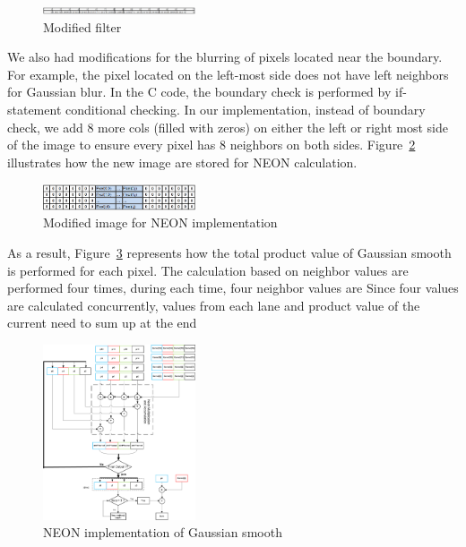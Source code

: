 \begin{figure}
\centering
\includegraphics[width=0.4\textwidth]{drawings/filter}
\caption{Modified filter}
\label{fig:newfilter}
\end{figure}

We also had modifications for the blurring of pixels located near the boundary. For example, the pixel located on the left-most side does not have left neighbors for Gaussian blur. In the C code, the boundary check is performed by if-statement conditional checking. In our implementation, instead of boundary check, we add 8 more cols (filled with zeros) on either the left or right most side of the image to ensure every pixel has 8 neighbors on both sides. Figure~\ref{fig:addcols} illustrates how the new image are stored for NEON calculation. 

\begin{figure}
\centering
\includegraphics[width=0.4\textwidth]{drawings/new_cols}
\caption{Modified image for NEON implementation}
\label{fig:addcols}
\end{figure}

As a result, Figure~\ref{fig:neon} represents how the total product value of Gaussian smooth is performed for each pixel. The calculation based on neighbor values are performed four times, during each time, four neighbor values are  Since four values are calculated concurrently, values from each lane and product value of the current  need to sum up at the end

\begin{figure}
\centering
\includegraphics[width=0.4\textwidth]{drawings/neon}
\caption{NEON implementation of Gaussian smooth}
\label{fig:neon}
\end{figure}
